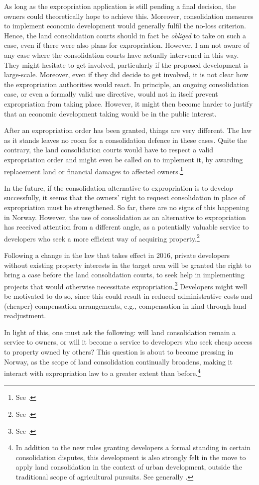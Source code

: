 As long as the expropriation application is still pending a final decision, the owners could theoretically hope to achieve this. Moreover, consolidation measures to implement economic development would generally fulfil the no-loss criterion. Hence, the land consolidation courts should in fact be {\it obliged} to take on such a case, even if there were also plans for expropriation. However, I am not aware of any case where the consolidation courts have actually intervened in this way. They might hesitate to get involved, particularly if the proposed development is large-scale. Moreover, even if they did decide to get involved, it is not clear how the expropriation authorities would react. In principle, an ongoing consolidation case, or even a formally valid use directive, would not in itself prevent expropriation from taking place. However, it might then become harder to justify that an economic development taking would be in the public interest.

After an expropriation order has been granted, things are very different. The law as it stands leaves no room for a consolidation defence in these cases. Quite the contrary, the land consolidation courts would have to respect a valid expropriation order and might even be called on to implement it, by awarding replacement land or financial damages to affected owners.\footnote{See \dni\cite[6]{lca79}.}

In the future, if the consolidation alternative to expropriation is to develop successfully, it seems that the owners' right to request consolidation in place of expropriation must be strengthened. So far, there are no signs of this happening in Norway. However, the use of consolidation as an alternative to expropriation has received attention from a different angle, as a potentially valuable service to developers who seek a more efficient way of acquiring property.\footnote{See \cite[84]{prop12}.}

Following a change in the law that takes effect in 2016, private developers without existing property interests in the target area will be granted the right to bring a case before the land consolidation courts, to seek help in implementing projects that would otherwise necessitate expropriation.\footnote{See \dni\cite[1-5(3)]{lca13}.} Developers might well be motivated to do so, since this could result in reduced administrative costs and (cheaper) compensation arrangements, e.g., compensation in kind through land readjustment.

In light of this, one must ask the following: will land consolidation remain a service to owners, or will it become a service to developers who seek cheap access to property owned by others? This question is about to become pressing in Norway, as the scope of land consolidation continually broadens, making it interact with expropriation law to a greater extent than before.\footnote{In addition to the new rules granting developers a formal standing in certain consolidation disputes, this development is also strongly felt in the move to apply land consolidation in the context of urban development, outside the traditional scope of agricultural pursuits. See generally \cite{stenseth07}.}

